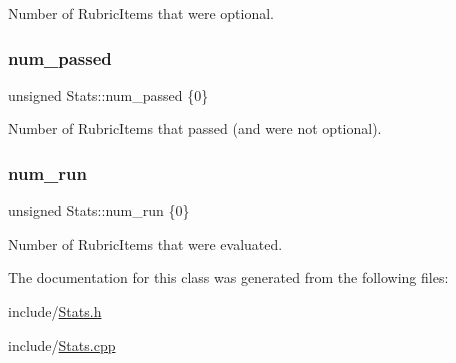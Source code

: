 Number of Rubric\+Items that were optional. \hypertarget{class_stats_a23aed2b3b568c55072f0bbf67cb98766}{}\label{class_stats_a23aed2b3b568c55072f0bbf67cb98766} 
\subsubsection{\texorpdfstring{num\+\_\+passed}{num\_passed}}
{\footnotesize\ttfamily unsigned Stats\+::num\+\_\+passed \{0\}}

Number of Rubric\+Items that passed (and were not optional). \hypertarget{class_stats_aad4b62381ae2f53d8449ed2adda1f112}{}\label{class_stats_aad4b62381ae2f53d8449ed2adda1f112} 
\subsubsection{\texorpdfstring{num\+\_\+run}{num\_run}}
{\footnotesize\ttfamily unsigned Stats\+::num\+\_\+run \{0\}}

Number of Rubric\+Items that were evaluated. 

The documentation for this class was generated from the following files\+:\begin{DoxyCompactItemize}
\item 
include/\hyperlink{_stats_8h}{Stats.\+h}\item 
include/\hyperlink{_stats_8cpp}{Stats.\+cpp}\end{DoxyCompactItemize}
